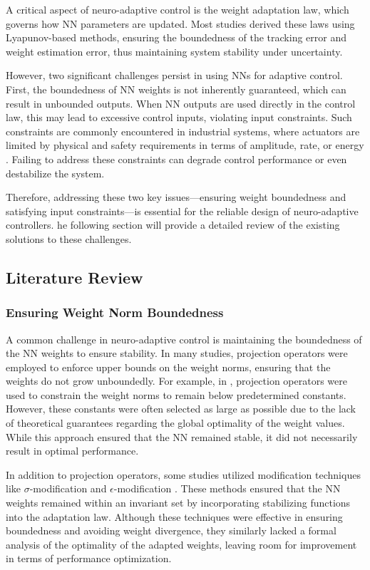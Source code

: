 \documentclass[final,5p,times,twocolumn,authoryear]{elsarticle}
\begin{document}
A critical aspect of neuro-adaptive control is the weight adaptation law, which governs how NN parameters are updated. 
Most studies derived these laws using Lyapunov-based methods, ensuring the boundedness of the tracking error and weight estimation error, thus maintaining system stability under uncertainty.

However, two significant challenges persist in using NNs for adaptive control. 
First, the boundedness of NN weights is not inherently guaranteed, which can result in unbounded outputs. 
When NN outputs are used directly in the control law, this may lead to excessive control inputs, violating input constraints. 
Such constraints are commonly encountered in industrial systems, where actuators are limited by physical and safety requirements in terms of amplitude, rate, or energy \cite{Esfandiari:2021aa}. 
Failing to address these constraints can degrade control performance or even destabilize the system.

Therefore, addressing these two key issues—ensuring weight boundedness and satisfying input constraints—is essential for the reliable design of neuro-adaptive controllers. 
he following section will provide a detailed review of the existing solutions to these challenges.

\subsection{Literature Review}

\subsubsection{Ensuring Weight Norm Boundedness}

A common challenge in neuro-adaptive control is maintaining the boundedness of the NN weights to ensure stability. 
In many studies, projection operators were employed to enforce upper bounds on the weight norms, ensuring that the weights do not grow unboundedly. 
For example, in \cite{Zhou:2023aa,Griffis:2023aa,Patil:2022aa}, projection operators were used to constrain the weight norms to remain below predetermined constants. 
However, these constants were often selected as large as possible due to the lack of theoretical guarantees regarding the global optimality of the weight values. 
While this approach ensured that the NN remained stable, it did not necessarily result in optimal performance.

In addition to projection operators, some studies utilized modification techniques like $\sigma$-modification \cite{Ge:2002aa} and $\epsilon$-modification \cite{Esfandiari:2015aa,Gao:2006aa}. 
These methods ensured that the NN weights remained within an invariant set by incorporating stabilizing functions into the adaptation law. 
Although these techniques were effective in ensuring boundedness and avoiding weight divergence, they similarly lacked a formal analysis of the optimality of the adapted weights, leaving room for improvement in terms of performance optimization.
\end{document}
